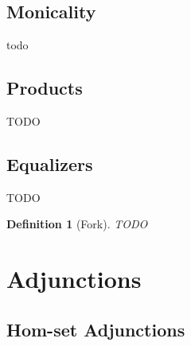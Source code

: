 \documentclass{article}
\theoremstyle{break}
\newtheorem{definition}[theorem]{Definition}
\numberwithin{theorem}{section}
\begin{document}
\subsection{Monicality}
todo

\subsection{Products}
TODO

\subsection{Equalizers}
TODO

\begin{definition}[Fork]
    TODO
\end{definition}


\section{Adjunctions}

\subsection{Hom-set Adjunctions}
\end{document}
